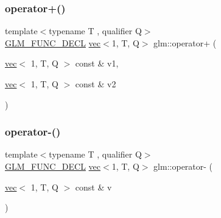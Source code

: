 \mbox{\label{group__ext__vec1_gadbe612a85d5c9d06f29d726d7998a8db}} 
\subsubsection{\texorpdfstring{operator+()}{operator+()}\hspace{0.1cm}{\footnotesize\ttfamily [4/4]}}
{\footnotesize\ttfamily template$<$typename T , qualifier Q$>$ \\
\hyperlink{setup_8hpp_ab2d052de21a70539923e9bcbf6e83a51}{G\+L\+M\+\_\+\+F\+U\+N\+C\+\_\+\+D\+E\+CL} \hyperlink{structglm_1_1vec}{vec}$<$1, T, Q$>$ glm\+::operator+ (\begin{DoxyParamCaption}\item[{\hyperlink{structglm_1_1vec}{vec}$<$ 1, T, Q $>$ const \&}]{v1,  }\item[{\hyperlink{structglm_1_1vec}{vec}$<$ 1, T, Q $>$ const \&}]{v2 }\end{DoxyParamCaption})}

\mbox{\label{group__ext__vec1_gad2032db9362999ab1c27aae09816c9fd}} 
\subsubsection{\texorpdfstring{operator-\/()}{operator-()}\hspace{0.1cm}{\footnotesize\ttfamily [1/4]}}
{\footnotesize\ttfamily template$<$typename T , qualifier Q$>$ \\
\hyperlink{setup_8hpp_ab2d052de21a70539923e9bcbf6e83a51}{G\+L\+M\+\_\+\+F\+U\+N\+C\+\_\+\+D\+E\+CL} \hyperlink{structglm_1_1vec}{vec}$<$1, T, Q$>$ glm\+::operator-\/ (\begin{DoxyParamCaption}\item[{\hyperlink{structglm_1_1vec}{vec}$<$ 1, T, Q $>$ const \&}]{v }\end{DoxyParamCaption})}

\mbox{\label{group__ext__vec1_ga8069f3e0f8b424bda71c65bdadaaf73c}} 
